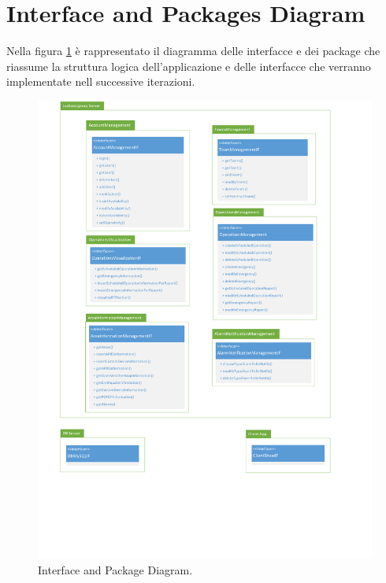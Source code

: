 \section{Interface and Packages Diagram}
Nella figura \ref{fig:InterfaceDiagram} è rappresentato il diagramma delle interfacce e dei package che riassume la struttura logica dell'applicazione e delle interfacce che verranno implementate nell successive iterazioni.

\begin{figure}[h!]
	\centering
	\includegraphics[width=0.8\linewidth]{./Iterazione 1/OtherFiles/UML - Interface diagram}
	\caption{Interface and Package Diagram.}
	\label{fig:InterfaceDiagram}
\end{figure}
